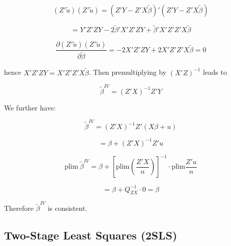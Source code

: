 \documentclass[12pt, oneside]{article}
\begin{document}
\[
(Z'\tilde{u})(Z'\tilde{u}) = (Z'Y - Z'X\tilde{\beta})'(Z'Y - Z'X\tilde{\beta})
\]

\[
= Y'Z'Z Y - 2\tilde{\beta}'X'Z'Z Y + \tilde{\beta}'X'Z'Z'X\tilde{\beta}
\]

\[
\frac{\partial (Z'\tilde{u})(Z'\tilde{u})}{\partial \tilde{\beta}} = -2X'Z'Z Y + 2X'Z'Z'X\tilde{\beta} = 0
\]

hence \( X'Z'Z Y = X'Z'Z'X\tilde{\beta} \). Then premultiplying by \( (X'Z)^{-1} \) leads to

\[
\tilde{\beta}^{IV} = (Z'X)^{-1}Z'Y
\]

We further have:

\[
\tilde{\beta}^{IV} = (Z'X)^{-1}Z'(X\beta + u)
\]

\[
= \beta + (Z'X)^{-1}Z'u
\]

\[
\text{plim} \ \tilde{\beta}^{IV} = \beta + \left[ \text{plim} \left( \frac{Z'X}{n} \right) \right]^{-1} \cdot \text{plim} \frac{Z'u}{n}
\]

\[
= \beta + Q_{ZX}^{-1} \cdot 0 = \beta
\]

Therefore \( \tilde{\beta}^{IV} \) is consistent.

\subsection{Two-Stage Least Squares (2SLS)}
\end{document}
